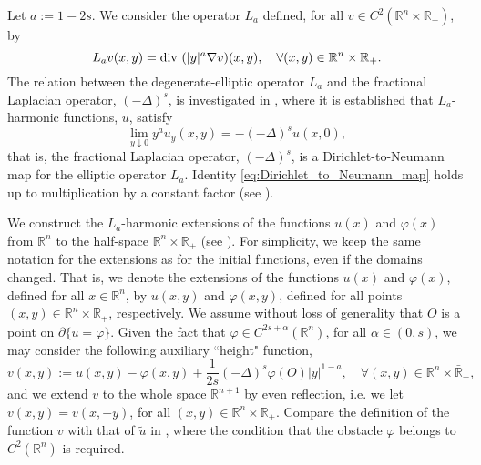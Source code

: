 \documentclass[11pt,reqno]{amsart}
\theoremstyle{definition}
\theoremstyle{remark}
\begin{document}
Let $a:=1-2s$. We consider the operator $L_a$ defined, for all $v\in C^2({\mathbb{R}}^n\times{\mathbb{R}}_+)$, by
\begin{equation}
\label{eq:L_a}
L_a v(x,y) = \hbox{div }(|y|^{a}\nabla v)(x,y),\quad\forall (x,y)\in {\mathbb{R}}^n\times{\mathbb{R}}_+.
\end{equation}
The relation between the degenerate-elliptic operator $L_a$ and the fractional Laplacian operator, $(-\Delta)^s$, is investigated in \cite[\S 3]{Caffarelli_Silvestre_2007}, where it is established that $L_a$-harmonic functions, $u$, satisfy
\begin{equation}
\label{eq:Dirichlet_to_Neumann_map}
\lim_{y\downarrow 0} y^a u_y(x,y) = -(-\Delta)^s u(x,0),
\end{equation}
that is, the fractional Laplacian operator, $(-\Delta)^s$, is a Dirichlet-to-Neumann map for the elliptic operator $L_a$. Identity \eqref{eq:Dirichlet_to_Neumann_map} holds up to multiplication by a constant factor (see \cite[Formula (3.1)]{Caffarelli_Silvestre_2007}).

We construct the $L_a$-harmonic extensions of the functions $u(x)$ and $\varphi(x)$ from ${\mathbb{R}}^n$ to the half-space ${\mathbb{R}}^n\times{\mathbb{R}}_+$ (see \cite[\S 2.4]{Caffarelli_Silvestre_2007}). For simplicity, we keep the same notation for the extensions as for the initial functions, even if the domains changed. That is, we denote the extensions of the functions $u(x)$  and $\varphi(x)$, defined for all $x\in {\mathbb{R}}^n$, by $u(x,y)$ and $\varphi(x,y)$, defined for all points $(x,y)\in{\mathbb{R}}^n\times{\mathbb{R}}_+$, respectively. We assume without loss of generality that $O$ is a point on $\partial\{u=\varphi\}$. Given the fact that $\varphi \in C^{2s+\alpha}({\mathbb{R}}^n)$, for all $\alpha \in (0,s)$, we may consider the following auxiliary ``height" function,
\begin{equation}
\label{eq:Auxiliary_function_v}
v(x,y) := u(x,y) - \varphi(x,y) + \frac{1}{2s}(-\Delta)^s\varphi(O)|y|^{1-a},\quad\forall (x,y)\in{\mathbb{R}}^n\times\bar{\mathbb{R}}_+,
\end{equation}
and we extend $v$ to the whole space ${\mathbb{R}}^{n+1}$ by even reflection, i.e. we let $v(x,y)=v(x,-y)$, for all $(x,y)\in{\mathbb{R}}^n\times{\mathbb{R}}_+$. Compare the definition of the function $v$ with that of $\widetilde u$ in \cite[p. 433]{Caffarelli_Silvestre_2007}, where the condition that the obstacle $\varphi$ belongs to $C^2({\mathbb{R}}^n)$ is required. 
\end{document}
